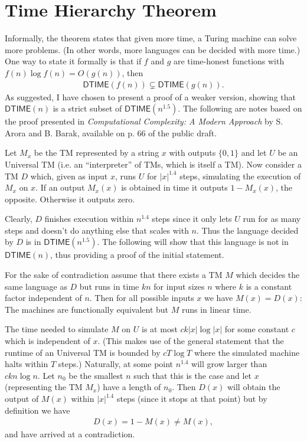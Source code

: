 \documentclass{article}
\begin{document}
\section*{Time Hierarchy Theorem}

Informally, the theorem states that given more time, a Turing machine can solve more problems. (In other words, more languages can be decided with more time.) One way to state it formally is that if $f$ and $g$ are time-honest functions with $f(n) \log f(n) = O(g(n))$, then
\begin{align*}
    \mathsf{DTIME}(f(n)) \subsetneq \mathsf{DTIME}\left(g(n)\right).
\end{align*}
As suggested, I have chosen to present a proof of a weaker version, showing that $\mathsf{DTIME}(n)$ is a strict subset of $\mathsf{DTIME}(n^{1.5})$. The following are notes based on the proof presented in \emph{Computational Complexity: A Modern Approach} by S. Arora and B. Barak, available on p. 66 of the public draft.

Let $M_x$ be the TM represented by a string $x$ with outputs $\{0, 1\}$ and let $U$ be an Universal TM (i.e. an \enquote{interpreter} of TMs, which is itself a TM). Now consider a TM $D$ which, given as input $x$, runs $U$ for $|x|^{1.4}$ steps, simulating the execution of $M_x$ on $x$. If an output $M_x(x)$ is obtained in time it outputs $1 - M_x(x)$, the opposite. Otherwise it outputs zero.

Clearly, $D$ finishes execution within $n^{1.4}$ steps since it only lets $U$ run for as many steps and doesn't do anything else that scales with $n$. Thus the language decided by $D$ is in $\mathsf{DTIME}(n^{1.5})$. The following will show that this language is not in $\mathsf{DTIME}(n)$, thus providing a proof of the initial statement.

For the sake of contradiction assume that there exists a TM $M$ which decides the same language as $D$ but runs in time $kn$ for input sizes $n$ where $k$ is a constant factor independent of $n$. Then for all possible inputs $x$ we have $M(x) = D(x)$: The machines are functionally equivalent but $M$ runs in linear time.

The time needed to simulate $M$ on $U$ is at most $ck|x|\log|x|$ for some constant $c$ which is independent of $x$. (This makes use of the general statement that the runtime of an Universal TM is bounded by $cT \log T$ where the simulated machine halts within $T$ steps.) Naturally, at some point $n^{1.4}$ will grow larger than $ckn \log n$. Let $n_0$ be the smallest $n$ such that this is the case and let $x$ (representing the TM $M_x$) have a length of $n_0$. Then $D(x)$ will obtain the output of $M(x)$ within $|x|^{1.4}$ steps (since it stops at that point) but by definition we have
\begin{align*}
    D(x) = 1 - M(x) \neq M(x),
\end{align*}
and have arrived at a contradiction.
\end{document}
